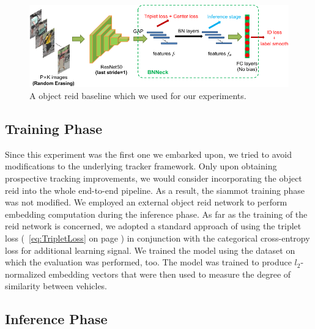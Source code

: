 \begin{figure}[!t]
    \centering
    \includegraphics[width=\linewidth]{figures/siamese_tracking/bagoftricks_reid_architecture.pdf}
    \caption[Gls{reid} baseline]{A object \gls{reid} baseline which we used for our experiments. }
    \label{fig:BagOfTricksReIDArchitecture}
\end{figure}

\subsection{Training Phase}

Since this experiment was the first one we embarked upon, we tried to avoid modifications to the underlying tracker framework. Only upon obtaining prospective tracking improvements, we would consider incorporating the object \gls{reid} into the whole end-to-end pipeline. As a result, the \gls{siammot} training phase was not modified. We employed an external object \gls{reid} network to perform embedding computation during the inference phase. As far as the training of the \gls{reid} network is concerned, we adopted a standard approach of using the triplet loss (\eqtext{}~\ref{eq:TripletLoss} on page \pageref{eq:TripletLoss}) in conjunction with the categorical cross-entropy loss for additional learning signal. We trained the model using the \verisss{} dataset on which the evaluation was performed, too. The model was trained to produce $l_2$-normalized embedding vectors that were then used to measure the degree of similarity between vehicles.

\subsection{Inference Phase}

